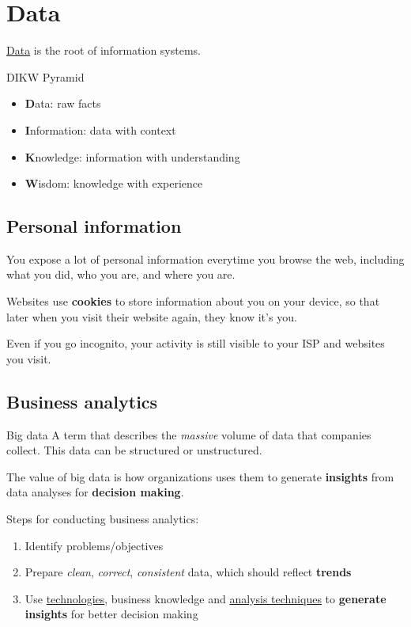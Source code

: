 \section{Data}

\hyperref[def:data]{Data} is the root of information systems.

\begin{definition}
    {DIKW Pyramid}
    \begin{itemize}
        \item \textbf{D}ata: raw facts
        \item \textbf{I}nformation: data with context
        \item \textbf{K}nowledge: information with understanding
        \item \textbf{W}isdom: knowledge with experience
    \end{itemize}
\end{definition}

\subsection{Personal information}

You expose a lot of personal information everytime you browse the web, including what you did, who you are, and where you are.

Websites use \textbf{cookies} to store information about you on your device, so that later when you visit their website again, they know it's you.

Even if you go incognito, your activity is still visible to your ISP and websites you visit.

\subsection{Business analytics}

\begin{definition}
    {Big data}
    A term that describes the \textit{massive} volume of data that companies collect. This data can be structured or unstructured.

    The value of big data is how organizations uses them to generate \textbf{insights} from data analyses for \textbf{decision making}.
\end{definition}

Steps for conducting business analytics:
\begin{enumerate}
    \item Identify problems/objectives
    \item Prepare \textit{clean}, \textit{correct}, \textit{consistent} data, which should reflect \textbf{trends}
    \item Use \hyperref[analysis:technology]{technologies}, business knowledge and \hyperref[analysis:technique]{analysis techniques} to \textbf{generate insights} for better decision making
\end{enumerate}

